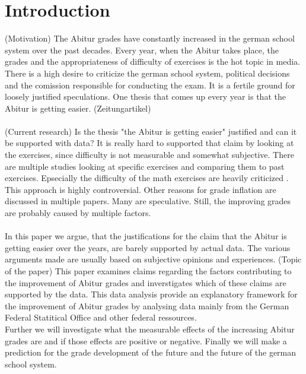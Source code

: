 \section{Introduction}
(Motivation)
The Abitur grades have constantly increased in the german school system over the past decades. Every year, when the Abitur takes place, the grades and the appropriateness of difficulty of exercises is the hot topic in media. \\
There is a high desire to criticize the german school system, political decisions and the comission responsible for conducting the exam. It is a fertile ground for loosely justified speculations. One thesis that comes up every year is that the Abitur is getting easier. (Zeitungartikel)\\\\
(Current research)
Is the thesis "the Abitur is getting easier" justified and can it be supported with data? It is really hard to supported that claim by looking at the exercises, since difficulty is not measurable and somewhat subjective. There are multiple studies looking at specific exercises and comparing them to past exercises. Epsecially the difficulty of the math exercises are heavily criticized \cite{kuhnel2015modellierungskompetenz} \cite{JahnkeKleinKühnelSonarSpindler+2014+115+122} \cite{lemmermeyer2019zentralabitur}. This approach is highly controversial. Other reasons for grade inflation are discussed in multiple papers. Many are speculative. Still, the improving grades are probably caused by multiple factors.\\\\
In this paper we argue, that the justifications for the claim that the Abitur is getting easier over the years, are barely supported by actual data. The various arguments made are usually based on subjective opinions and experiences.
(Topic of the paper)
This paper examines claims regarding the factors contributing to the improvement of Abitur grades and inverstigates which of these claims are supported by the data. This data analysis provide an explanatory framework for the improvement of Abitur grades by analysing data mainly from the German Federal Statitical Office and other federal ressources.\\
Further we will investigate what the measurable effects of the increasing Abitur grades are and if those effects are positive or negative. Finally we will make a prediction for the grade development of the future and the future of the german school system.
